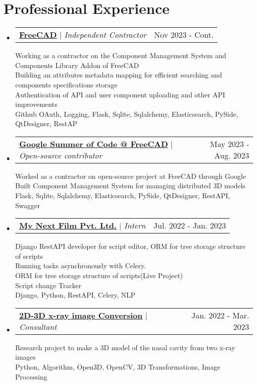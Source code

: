 \documentclass[letterpaper,11pt]{article}%
\makeatletter
\newcommand{\resumeProjectHeading}[2]{
    \item
    \begin{tabular*}{0.97\textwidth}{l@{\extracolsep{\fill}}r}
      \small#1 & #2 \\
    \end{tabular*}\vspace{-7pt}
}
\newcommand{\resumeSubHeadingListStart}{\begin{itemize}[leftmargin=0.15in, label={}]}
\newcommand{\resumeSubHeadingListEnd}{\end{itemize}}
\makeatother
\begin{document}
\section{Professional Experience}%
\label{sec:ProfessionalExperience}%

%
\resumeSubHeadingListStart%
\resumeProjectHeading{\textbf{\href{https://github.com/FreeCAD/FreeCAD-Component-Management-System}{\underline{FreeCAD}}} $|$ \footnotesize\emph{Independent Contractor}\vspace{8pt}}{Nov 2023 - Cont.}{\small{Working as a contractor on the Component Management System and Components Library Addon of FreeCAD}}\\
{\small{Building an attributes metadata mapping for efficient searching and components specifications storage}}\\
{\small{Authentication of API and user component uploading and other API improvements}}\\
{\small{Github OAuth, Logging, Flask, Sqlite, Sqlalchemy, Elasticsearch, PySide, QtDesigner, RestAP}}%
\resumeProjectHeading{\textbf{\href{https://summerofcode.withgoogle.com/archive/2023/projects/h7rrw0s0}{\underline{Google Summer of Code @ FreeCAD}}} $|$ \footnotesize\emph{Open-source contributor}\vspace{8pt}}{May 2023 - Aug. 2023}{\small{Worked as a contractor on open-source project at FreeCAD through Google}}\\
{\small{Built Component Management System for managing distributed 3D models}}\\
{\small{Flask, Sqlite, Sqlalchemy, Elasticsearch, PySide, QtDesigner, RestAPI, Swagger}}%
\resumeProjectHeading{\textbf{\href{}{\underline{My Next Film Pvt. Ltd.}}} $|$ \footnotesize\emph{Intern}\vspace{8pt}}{Jul. 2022 - Jan. 2023}{\small{Django RestAPI developer for script editor, ORM for tree storage structure of scripts}}\\
{\small{Running tasks asynchronously with Celery.}}\\
{\small{ORM for tree storage structure of scripts(Live Project)}}\\
{\small{Script change Tracker}}\\
{\small{Django, Python, RestAPI, Celery, NLP}}%
\resumeProjectHeading{\textbf{\href{}{\underline{2D-3D x-ray image Conversion}}} $|$ \footnotesize\emph{Consultant}\vspace{8pt}}{Jan. 2022 - Mar. 2023}{\small{Research project to make a 3D model of the nasal cavity from two x-ray images}}\\
{\small{Python, Algorithm, Open3D, OpenCV, 3D Transformations, Image Processing}}%
\resumeSubHeadingListEnd%
\end{document}
